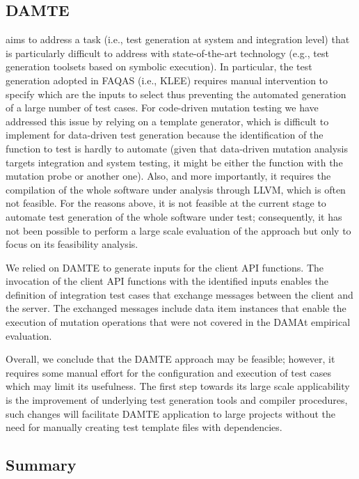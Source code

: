\subsection{DAMTE}

\DAMTE aims to address a task (i.e., test generation at system and integration level) that is particularly difficult to address with state-of-the-art technology (e.g., test generation toolsets based on symbolic execution). In particular, the test generation adopted in FAQAS (i.e., KLEE) requires manual intervention to specify which are the inputs to select thus preventing the automated generation of a large number of test cases. For code-driven mutation testing we have addressed this issue by relying on a template generator, which is difficult to implement for data-driven test generation because the identification of the function to test is hardly to automate (given that data-driven mutation analysis targets integration and system testing, it might be either the function with the mutation probe or another one). Also, and more importantly, it requires the compilation of the whole software under analysis through LLVM, which is often not feasible. For the reasons above, it is not feasible at the current stage to automate test generation of the whole software under test; consequently, 
it has not been possible to perform a large scale evaluation of the approach but only to focus on its feasibility analysis.

We relied on DAMTE to generate inputs for the \PARAM client API functions. The invocation of the \PARAM client API functions with the identified inputs enables the definition of integration test cases that exchange messages between the \PARAM client and the \PARAM server. The exchanged messages include data item instances that enable the execution of mutation operations that were not covered in the DAMAt empirical evaluation.

Overall, we conclude that the DAMTE approach may be feasible; however, it requires some manual effort for the configuration and execution of test cases which may limit its usefulness. The first step towards its large scale applicability is the improvement of underlying test generation tools and compiler procedures, such changes will facilitate DAMTE application to large projects without the need for manually creating test template files with dependencies.

\subsection{Summary}

